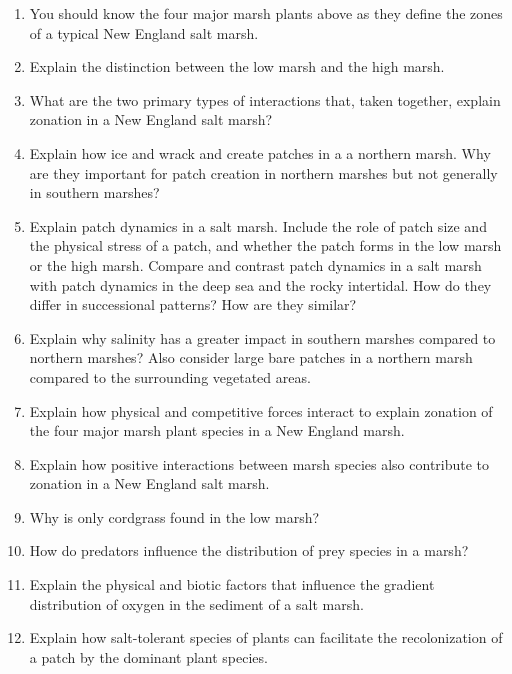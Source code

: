 \documentclass[nofonts, letterpaper]{tufte-handout}
\begin{document}
\begin{enumerate}
\item
  You should know the four major marsh plants above as they define the
  zones of a typical New England salt marsh.
\item
  Explain the distinction between the low marsh and the high marsh.
\item
  What are the two primary types of interactions that, taken together,
  explain zonation in a New England salt marsh?
\item
  Explain how ice and wrack and create patches in a a northern marsh.
  Why are they important for patch creation in northern marshes but not
  generally in southern marshes?
\item
  Explain patch dynamics in a salt marsh. Include the role of patch size
  and the physical stress of a patch, and whether the patch forms in the
  low marsh or the high marsh. Compare and contrast patch dynamics in a
  salt marsh with patch dynamics in the deep sea and the rocky
  intertidal. How do they differ in successional patterns? How are they
  similar?
\item
  Explain why salinity has a greater impact in southern marshes compared
  to northern marshes? Also consider large bare patches in a northern
  marsh compared to the surrounding vegetated areas.
\item
  Explain how physical and competitive forces interact to explain
  zonation of the four major marsh plant species in a New England marsh.
\item
  Explain how positive interactions between marsh species also
  contribute to zonation in a New England salt marsh.
\item
  Why is only cordgrass found in the low marsh?
\item
  How do predators influence the distribution of prey species in a
  marsh?
\item
  Explain the physical and biotic factors that influence the gradient
  distribution of oxygen in the sediment of a salt marsh.
\item
  Explain how salt-tolerant species of plants can facilitate the
  recolonization of a patch by the dominant plant species.
\end{enumerate}
\end{document}

